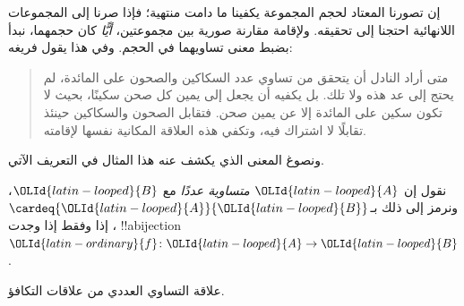 \documentclass[../../../include/open-logic-section]{subfiles}
\begin{document}


إن تصورنا المعتاد لحجم المجموعة يكفينا ما دامت منتهية؛ فإذا صرنا إلى المجموعات اللانهائية احتجنا إلى تحقيقه. ولإقامة مقارنة صورية بين مجموعتين، \emph{أيًّا} كان حجمهما، نبدأ بضبط معنى تساويهما في الحجم. وفي هذا يقول فريغه:
\begin{quote}
متى أراد النادل أن يتحقق من تساوي عدد السكاكين والصحون على المائدة، لم يحتج إلى عد هذه ولا تلك. بل يكفيه أن يجعل إلى يمين كل صحن سكينًا، بحيث لا تكون سكين على المائدة إلا عن يمين صحن. فتقابل الصحون والسكاكين حينئذ تقابلًا لا اشتراك فيه، وتكفي هذه العلاقة المكانية نفسها لإقامته. \citep[\S70]{Frege1884}
\end{quote}
ونصوغ المعنى الذي يكشف عنه هذا المثال في التعريف الآتي.

\begin{defn}
نقول إن ${\OLId{latin-looped}{A}}$ \emph{متساوية عددًا} مع ${\OLId{latin-looped}{B}}$، ونرمز إلى ذلك بـ$\cardeq{{\OLId{latin-looped}{A}}}{{\OLId{latin-looped}{B}}}$، إذا وفقط إذا وجدت !!a{bijection} ${\OLId{latin-ordinary}{f}} \colon {\OLId{latin-looped}{A}} \to {\OLId{latin-looped}{B}}$.
\end{defn}

\begin{prop}
علاقة التساوي العددي من علاقات التكافؤ.
\end{prop}
\end{document}
